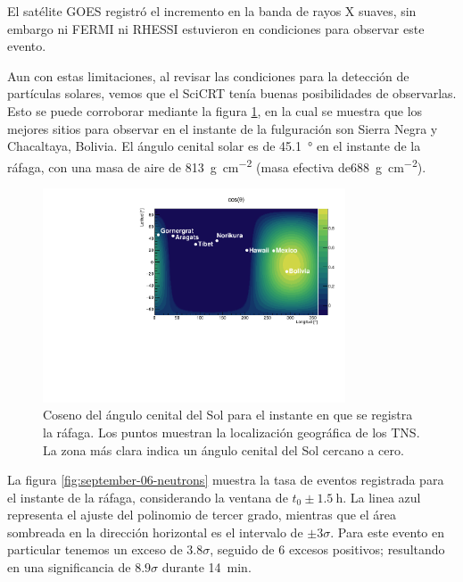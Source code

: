 El satélite GOES registró el incremento en la banda de rayos X suaves, sin embargo ni FERMI ni RHESSI estuvieron en condiciones para observar este evento.

Aun con estas limitaciones, al revisar las condiciones para la detección de partículas solares, vemos que el SciCRT tenía buenas posibilidades de observarlas. Esto se puede corroborar mediante la figura \ref{fig:september-06-zenith}, en la cual se muestra que los mejores sitios para observar en el instante de la fulguración son Sierra Negra y Chacaltaya, Bolivia. El ángulo cenital solar es de \SI{45.1}{\degree} en el instante de la ráfaga, con una masa de aire de \SI{813}{\gram\per\square\cm} (masa efectiva de\SI{688}{\gram\per\square\cm}).

\begin{figure}
        \centering
        \includegraphics[width=0.8\textwidth]{cosz_170906.pdf}
        \caption{Coseno del ángulo cenital del Sol para el instante en que se registra la ráfaga. Los puntos muestran la localización geográfica de los TNS. La zona más clara indica un ángulo cenital del Sol cercano a cero.}
        \label{fig:september-06-zenith}
\end{figure}

La figura \ref{fig:september-06-neutrons} muestra la tasa de eventos registrada para el instante de la ráfaga, considerando la ventana de $t_{0}\pm\SI{1.5}{\hour}$. La linea azul representa el ajuste del polinomio de tercer grado, mientras que el área sombreada en la dirección horizontal es el intervalo de $\pm 3\sigma$. Para este evento en particular tenemos un exceso de $3.8\sigma$, seguido de \num{6} excesos positivos; resultando en una significancia de $8.9\sigma$ durante \SI{14}{\minute}.

